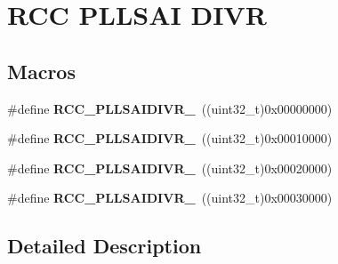 \hypertarget{group___r_c_c_ex___p_l_l_s_a_i___d_i_v_r}{}\section{R\+CC P\+L\+L\+S\+AI D\+I\+VR}
\label{group___r_c_c_ex___p_l_l_s_a_i___d_i_v_r}
\subsection*{Macros}
\begin{DoxyCompactItemize}
\item 
\#define {\bfseries R\+C\+C\+\_\+\+P\+L\+L\+S\+A\+I\+D\+I\+V\+R\+\_}~((uint32\+\_\+t)0x00000000)\hypertarget{group___r_c_c_ex___p_l_l_s_a_i___d_i_v_r_gaa982ada83c0104fa63c18d07edc57e6a}{}\label{group___r_c_c_ex___p_l_l_s_a_i___d_i_v_r_gaa982ada83c0104fa63c18d07edc57e6a}

\item 
\#define {\bfseries R\+C\+C\+\_\+\+P\+L\+L\+S\+A\+I\+D\+I\+V\+R\+\_}~((uint32\+\_\+t)0x00010000)\hypertarget{group___r_c_c_ex___p_l_l_s_a_i___d_i_v_r_ga31afbd678ec2b1bb3cc61971e59f4200}{}\label{group___r_c_c_ex___p_l_l_s_a_i___d_i_v_r_ga31afbd678ec2b1bb3cc61971e59f4200}

\item 
\#define {\bfseries R\+C\+C\+\_\+\+P\+L\+L\+S\+A\+I\+D\+I\+V\+R\+\_}~((uint32\+\_\+t)0x00020000)\hypertarget{group___r_c_c_ex___p_l_l_s_a_i___d_i_v_r_ga5744d352d7815517bbfe46b872497334}{}\label{group___r_c_c_ex___p_l_l_s_a_i___d_i_v_r_ga5744d352d7815517bbfe46b872497334}

\item 
\#define {\bfseries R\+C\+C\+\_\+\+P\+L\+L\+S\+A\+I\+D\+I\+V\+R\+\_}~((uint32\+\_\+t)0x00030000)\hypertarget{group___r_c_c_ex___p_l_l_s_a_i___d_i_v_r_ga5e4b0cae8d6c2f0257b161576d497c77}{}\label{group___r_c_c_ex___p_l_l_s_a_i___d_i_v_r_ga5e4b0cae8d6c2f0257b161576d497c77}

\end{DoxyCompactItemize}


\subsection{Detailed Description}
